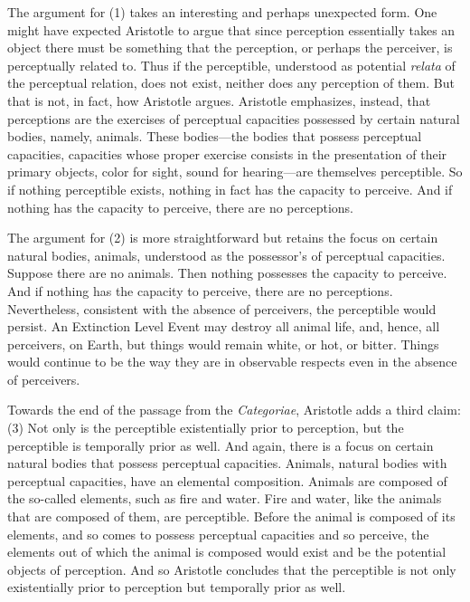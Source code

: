 The argument for (1) takes an interesting and perhaps unexpected form. One might have expected Aristotle to argue that since perception essentially takes an object there must be something that the perception, or perhaps the perceiver, is perceptually related to. Thus if the perceptible, understood as potential \emph{relata} of the perceptual relation, does not exist, neither does any perception of them. But that is not, in fact, how Aristotle argues. Aristotle emphasizes, instead, that perceptions are the exercises of perceptual capacities possessed by certain natural bodies, namely, animals. These bodies---the bodies that possess perceptual capacities, capacities whose proper exercise consists in the presentation of their primary objects, color for sight, sound for hearing---are themselves perceptible. So if nothing perceptible exists, nothing in fact has the capacity to perceive. And if nothing has the capacity to perceive, there are no perceptions.

The argument for (2) is more straightforward but retains the focus on certain natural bodies, animals, understood as the possessor's of perceptual capacities. Suppose there are no animals. Then nothing possesses the capacity to perceive. And if nothing has the capacity to perceive, there are no perceptions. Nevertheless, consistent with the absence of perceivers, the perceptible would persist. An Extinction Level Event may destroy all animal life, and, hence, all perceivers, on Earth, but things would remain white, or hot, or bitter. Things would continue to be the way they are in observable respects even in the absence of perceivers.

Towards the end of the passage from the \emph{Categoriae}, Aristotle adds a third claim: (3) Not only is the perceptible existentially prior to perception, but the perceptible is temporally prior as well. And again, there is a focus on certain natural bodies that possess perceptual capacities. Animals, natural bodies with perceptual capacities, have an elemental composition. Animals are composed of the so-called elements, such as fire and water. Fire and water, like the animals that are composed of them, are perceptible. Before the animal is composed of its elements, and so comes to possess perceptual capacities and so perceive, the elements out of which the animal is composed would exist and be the potential objects of perception. And so Aristotle concludes that the perceptible is not only existentially prior to perception but temporally prior as well.

